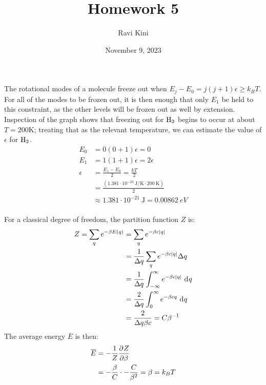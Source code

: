 \documentclass{article}
\title{Homework 5}
\author{Ravi Kini}
\date{November 9, 2023}
\begin{document}
\maketitle

\problem
The rotational modes of a molecule freeze out when $E_j - E_0 = j(j + 1)\epsilon \geq k_BT$. For all of the modes to be frozen out, it is then enough that only $E_1$ be held to this constraint, as the other levels will be frozen out as well by extension. Inspection of the graph shows that freezing out for $\ce{H2}$ begins to occur at about $T = 200 \unit{\kelvin}$; treating that as the relevant temperature, we can estimate the value of $\epsilon$ for $\ce{H2}$.
\begin{equation}
    \begin{split}
        E_0 & = 0\left(0 + 1\right)\epsilon = 0  \\
        E_1 & = 1\left(1 + 1\right)\epsilon = 2\epsilon \\
        \epsilon & = \frac{E_1 - E_0}{2} = \frac{kT}{2} \\
        & = \frac{\left(1.381 \cdot 10^{-23}~\unit{\joule\per\kelvin} \cdot 200~\unit{\kelvin}\right)}{2} \\
        & \approx 1.381 \cdot 10^{-21}~\unit{\joule} = 0.00862~\unit{eV} \\
    \end{split}
\end{equation}

\clearpage

For a classical degree of freedom, the partition function $Z$ is:
\begin{equation}
    \begin{split}
        Z = \sum_q e^{-\beta E\left(q\right)} & = \sum_q e^{-\beta c\left|q\right|} \\
        & = \frac{1}{\Delta q} \sum_q e^{-\beta c\left|q\right|} \Delta q \\
        & = \frac{1}{\Delta q} \int_{-\infty}^{\infty} e^{-\beta c\left|q\right|} \, \diff{q} \\
        & = \frac{2}{\Delta q} \int_{0}^{\infty} e^{-\beta cq} \, \diff{q} \\
        & = \frac{2}{\Delta q \beta c} = C\beta^{-1} \\
    \end{split}
\end{equation}
The average energy $\overline{E}$ is then:
\begin{equation}
    \begin{split}
        \overline{E} & = -\frac{1}{Z}\frac{\partial^{}Z} {\partial \beta^{}} \\
        & = -\frac{\beta}{C} \cdot -\frac{C}{\beta^2} = \beta = k_BT
    \end{split}
\end{equation}
\end{document}
